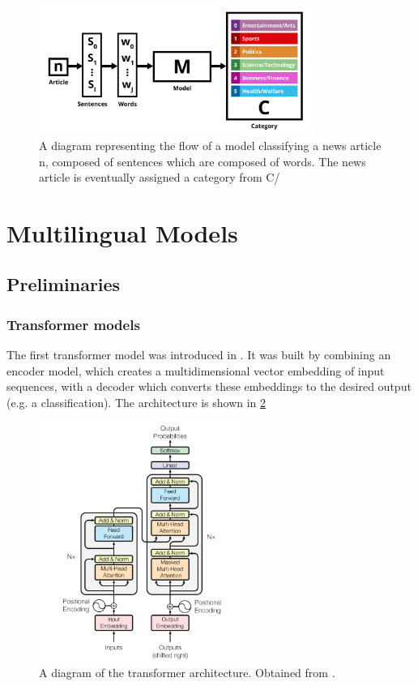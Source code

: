 \documentclass{l4proj}
\begin{document}
 \begin{figure}[h]
\centering
\includegraphics[width=0.8\textwidth]{images/Task Definition.png}
\caption{A diagram representing the flow of a model classifying a news article n, composed of sentences which are composed of words. The news article is eventually assigned a category from C/}
\label{fig:task-definition}
\end{figure}


\section{Multilingual Models}
\subsection{Preliminaries}
\label{section:preliminaries}
\subsubsection{Transformer models} \hfill \par
The first transformer model was introduced in \cite{vaswani2017attention}. It was built by combining an encoder model, which creates a multidimensional vector embedding of input sequences, with a decoder which converts these embeddings to the desired output (e.g. a classification). The architecture is shown in \ref{fig:transformer-architecture}

 \begin{figure}[h]
\centering
\includegraphics[width=0.6\textwidth]{images/transformer-architecture.png}
\caption{A diagram of the transformer architecture. Obtained from \cite{vaswani2017attention}.}
\label{fig:transformer-architecture}
\end{figure}
\end{document}
